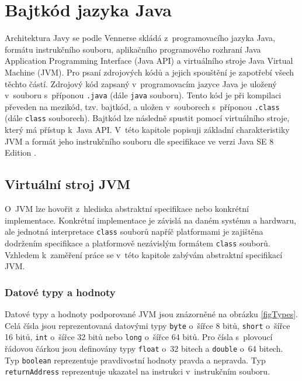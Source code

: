 \chapter{Bajtkód jazyka Java}\label{Bytecode}

Architektura Javy se podle Vennerse \cite{Venners:InsideJVM} skládá z~programovacího jazyka Java, formátu instrukčního souboru, aplikačního programového rozhraní Java Application Programming Interface (Java API) a virtuálního stroje Java Virtual Machine (JVM). Pro psaní zdrojových kódů a jejich spouštění je zapotřebí všech těchto částí.
Zdrojový kód zapsaný v~programovacím jazyce Java je uložený v~souboru s~příponou \texttt{.java} (dále \texttt{java} souboru). Tento kód je při kompilaci převeden na mezikód, tzv. bajtkód, a uložen v~souborech s~příponou \texttt{.class} (dále \texttt{class} souborech). Bajtkód lze následně spustit pomocí virtuálního stroje, který má přístup k~Java API. 
V~této kapitole popisuji základní charakteristiky JVM a formát jeho instrukčního souboru dle specifikace ve verzi Java SE 8 Edition \cite{Lindholm:JVM}.

\section{Virtuální stroj JVM}\label{JVM}

O~JVM lze  hovořit z~hlediska abstraktní specifikace nebo konkrétní implementace. Konkrétní implementace je závislá na daném systému a hardwaru, ale jednotná interpretace \texttt{class} souborů napříč platformami je zajištěna dodržením specifikace a platformově nezávislým formátem \texttt{class} souborů. Vzhledem k~zaměření práce se v~této kapitole zabývám abstraktní specifikací JVM.

\subsection{Datové typy a hodnoty}\label{JVMTypes}

Datové typy a hodnoty podporované JVM jsou znázorněné na obrázku \ref{figTypes}. Celá čísla jsou reprezentovaná datovými typy \texttt{byte} o~šířce 8 bitů, \texttt{short} o~šířce 16 bitů, \texttt{int} o~šířce 32 bitů nebo \texttt{long} o~šířce 64 bitů. Pro čísla s~plovoucí řádovou čárkou jsou definovány typy \texttt{float} o~32 bitech a \texttt{double} o~64 bitech. Typ \texttt{boolean} reprezentuje pravdivostní hodnoty pravda a nepravda. Typ \texttt{returnAddress} reprezentuje ukazatel na instrukci v~instrukčním souboru.

